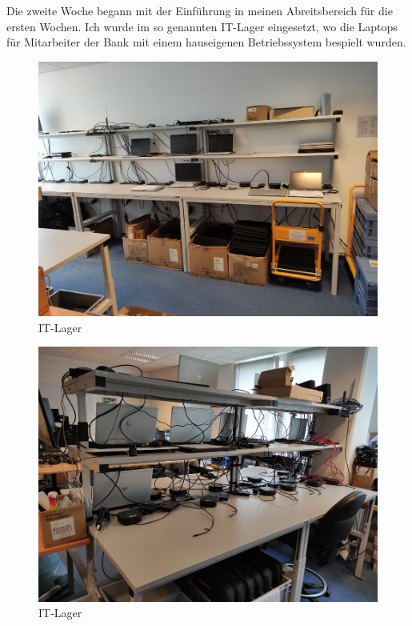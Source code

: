 Die zweite Woche begann mit der Einführung in meinen Abreitsbereich für die ersten Wochen. Ich wurde im so genannten IT-Lager eingesetzt, wo die Laptops für Mitarbeiter der Bank mit einem hauseigenen Betriebssystem bespielt wurden.
\begin{figure}[H] 
  \centering
     \includegraphics[width=1\textwidth]{itlager.jpg}
  \caption{IT-Lager}
  \label{fig:Bild1}
\end{figure} 
\begin{figure}[H] 
  \centering
     \includegraphics[width=1\textwidth]{itlager1.jpg}
  \caption{IT-Lager}
  \label{fig:Bild1}
\end{figure} 
\noindent
